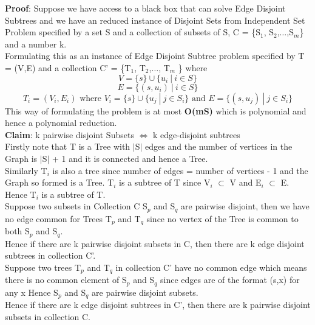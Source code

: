 \documentclass{report}
\begin{document}
 \textbf{Proof}: Suppose we have access to a black box that can solve Edge Disjoint Subtrees and we have an reduced instance of Disjoint Sets from Independent Set Problem specified by a set S and a collection of subsets of S, C = \{S$_1$, S$_2$,$\dots$,S$_m$\} and a number k.\vspace*{0.2em}\\
 Formulating this as an instance of Edge Disjoint Subtree problem specified by T = (V,E) and a collection C' = \{T$_1$, T$_2$,$\dots$, T$_m$ \} where 
 \begin{equation*}
     V = \{s\} \cup \{ u_i \ | \ i \in S \}
 \end{equation*}
 \begin{equation*}
     E = \{ (s,u_i) \ | \ i \in S \}
 \end{equation*}
 \begin{equation*}
     T_i = (V_i,E_i) \text{ where } V_i = \{s\} \cup \{ u_j \ | \ j \in S_i \} \text{ and } E = \{ (s,u_j) \ | \ j \in S_i \}
 \end{equation*}
 This way of formulating the problem is at most \textbf{O(mS)} which is polynomial and hence a polynomial reduction.\vspace*{0.2em}\\
 \textbf{Claim}: k  pairwise disjoint Subsets $\iff$ k edge-disjoint subtrees\vspace*{0.5em}\\
 Firstly note that T is a Tree with $|$S$|$ edges and the number of vertices in the Graph is  $|$S$|$ + 1 and it is connected and hence a Tree.\\
 Similarly T$_i$ is also a tree since number of edges = number of vertices - 1 and the Graph so formed is a Tree. T$_i$ is a subtree of T since V$_i$ $\subset$ V and E$_i$ $\subset$ E. Hence T$_i$ is a subtree of T.\\
 Suppose two subsets in Collection C S$_p$ and S$_q$ are pairwise disjoint, then we have no edge common for Trees T$_p$ and T$_q$ since no vertex of the Tree is common to both S$_p$ and S$_q$.\\
 Hence if there are k pairwise disjoint subsets in C, then there are k edge disjoint subtrees in collection C'.\vspace*{0.5em}\\
 Suppose two trees T$_p$ and T$_q$ in collection C' have no common edge which means there is no common element of S$_p$ and S$_q$ since edges are of the format (s,x) for any x Hence S$_p$ and S$_q$ are pairwise disjoint subsets.\\
 Hence if there are k edge disjoint subtrees in C', then there are k pairwise disjoint subsets in collection C.\vspace*{0.5em}\\
\end{document}
